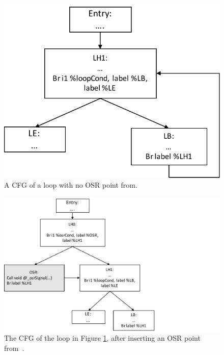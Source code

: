 \begin{figure}[h]
\centering
\includegraphics[scale=0.5]{Figures/BaseCFG}
\decoRule
\caption[A CFG of a loop with no OSR point]{A CFG of a loop with no OSR point from\cite{lameed2013modular}.}
\label{BaseCFG}
\end{figure}

\begin{figure}[h]
\centering
\includegraphics[scale=0.5]{Figures/InsertCFG}
\decoRule
\caption[The CFG of the loop in Figure \ref{BaseCFG}, after inserting an OSR point]{The CFG of the loop in Figure \ref{BaseCFG}, after inserting an OSR point from~\cite{lameed2013modular}.}
\label{InsertCFG}
\end{figure}

